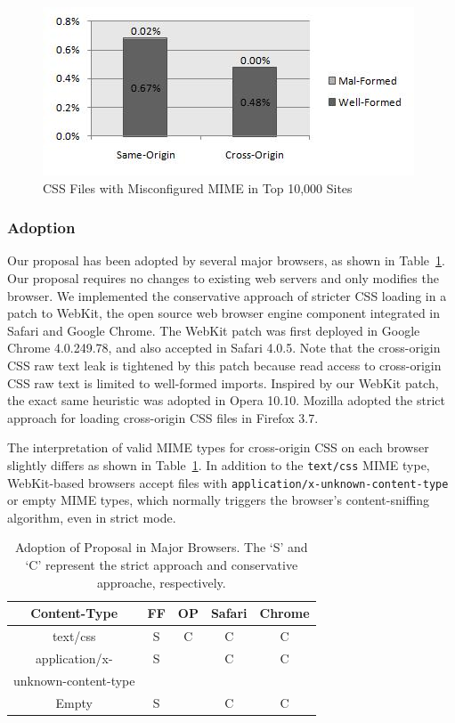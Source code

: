 \documentclass{acm_proc_article-sp}
\begin{document}
\begin{figure}
\centering
\includegraphics[width=\linewidth]{mime.jpg}
\caption{CSS Files with Misconfigured MIME in Top 10,000 Sites}
\end{figure}

\subsubsection{Adoption}
Our proposal has been adopted by several major browsers, as shown in Table~\ref{table:adoption}. Our proposal requires no changes to existing web servers and only modifies the browser. We implemented the conservative approach of stricter CSS loading in a patch to WebKit, the open source web browser engine component integrated in Safari and Google Chrome. The WebKit patch was first deployed in Google Chrome 4.0.249.78, and also accepted in Safari 4.0.5. Note that the cross-origin CSS raw text leak is tightened by this patch because read access to cross-origin CSS raw text is limited to well-formed imports. Inspired by our WebKit patch, the exact same heuristic was adopted in Opera 10.10. Mozilla adopted the strict approach for loading cross-origin CSS files in Firefox 3.7.

The interpretation of valid MIME types for cross-origin CSS on each browser slightly differs as shown in Table~\ref{table:adoption}. In addition to the \texttt{text/css} MIME type, WebKit-based browsers accept files with \texttt{application/x-unknown-content-type} or empty MIME types, which normally triggers the browser's content-sniffing algorithm, even in strict mode. %

\begin{table}
\centering
\begin{tabular}{|c|c|c|c|c|} \hline
Content-Type&FF&OP&Safari&Chrome\\ \hline
text/css&S&C&C&C\\ \hline
application/x-&S&&C&C\\ 
unknown-content-type&&&&\\ \hline
Empty&S&&C&C\\ %
\hline\end{tabular}
\caption{Adoption of Proposal in Major Browsers. The `S' and `C' represent the strict approach and conservative approache, respectively.}
\label{table:adoption}
\end{table}
\end{document}
